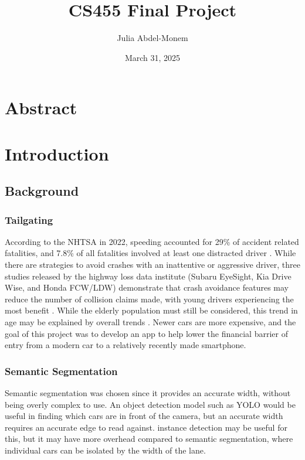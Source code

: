 \documentclass[12pt]{article}
\title{CS455 Final Project}
\author{Julia Abdel-Monem}
\date{March 31, 2025}
\begin{document}
    \maketitle

    \section*{Abstract}


    \section{Introduction}

    \subsection*{Background}

    \subsubsection*{Tailgating}

    According to the NHTSA in 2022, speeding accounted for 29\% of accident related fatalities, and 7.8\% of all fatalities involved at least one distracted driver \cite{NHTSA:Overview-2022}. While there are strategies to avoid crashes with an inattentive or aggressive driver, three studies released by the highway loss data institute (Subaru EyeSight, Kia Drive Wise, and Honda FCW/LDW) demonstrate that crash avoidance features may reduce the number of collision claims made, with young drivers experiencing the most benefit \cite{HLDI:SubaruEyeSight, HLDI:KiaDriveWise, HLDI:HondaFCW}. While the elderly population must still be considered, this trend in age may be explained by overall trends \cite{NHTSA:Overview-2022}. Newer cars are more expensive, and the goal of this project was to develop an app to help lower the financial barrier of entry from a modern car to a relatively recently made smartphone.

    \subsubsection*{Semantic Segmentation}

    Semantic segmentation was chosen since it provides an accurate width, without being overly complex to use. An object detection model such as YOLO would be useful in finding which cars are in front of the camera, but an accurate width requires an accurate edge to read against. instance detection may be useful for this, but it may have more overhead compared to semantic segmentation, where individual cars can be isolated by the width of the lane.
\end{document}
